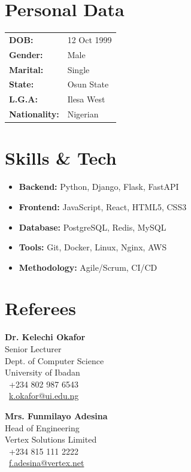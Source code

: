 \documentclass[10pt,a4paper]{article}
\begin{document}
\begin{minipage}[t]{0.31\textwidth}
    \raggedright
    \section*{Personal Data}
    \begin{tabular}{@{}ll@{}}
        \textbf{DOB:} & 12 Oct 1999 \\
        \textbf{Gender:} & Male \\
        \textbf{Marital:} & Single \\
        \textbf{State:} & Osun State \\
        \textbf{L.G.A:} & Ilesa West \\
        \textbf{Nationality:} & Nigerian \\
    \end{tabular}

    \section*{Skills \& Tech}
    \begin{itemize}[leftmargin=*,noitemsep,topsep=0pt]
        \item \textbf{Backend:} Python, Django, Flask, FastAPI
        \item \textbf{Frontend:} JavaScript, React, HTML5, CSS3
        \item \textbf{Database:} PostgreSQL, Redis, MySQL
        \item \textbf{Tools:} Git, Docker, Linux, Nginx, AWS
        \item \textbf{Methodology:} Agile/Scrum, CI/CD
    \end{itemize}

    \section*{Referees}
    \textbf{Dr. Kelechi Okafor} \\
    {\small Senior Lecturer} \\
    {\small Dept. of Computer Science} \\
    {\small University of Ibadan} \\
    {\small \faPhone\ +234 802 987 6543} \\
    {\small \faEnvelope\ \href{mailto:k.okafor@ui.edu.ng}{k.okafor@ui.edu.ng}}

    \vspace{0.3cm}

    \textbf{Mrs. Funmilayo Adesina} \\
    {\small Head of Engineering} \\
    {\small Vertex Solutions Limited} \\
    {\small \faPhone\ +234 815 111 2222} \\
    {\small \faEnvelope\ \href{mailto:f.adesina@vertex.net}{f.adesina@vertex.net}}
\end{minipage}
\end{document}
